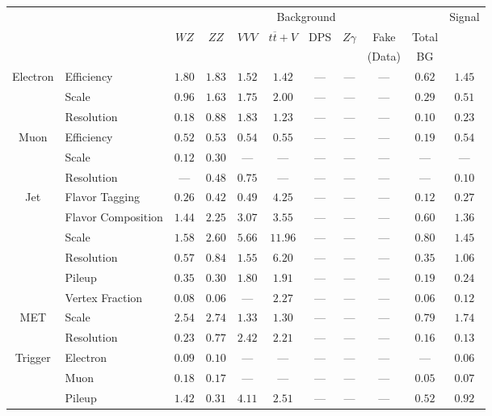 \small
\renewcommand{\tabcolsep}{4pt}
\begin{tabular}{|cl||ccccccc|c||c|}
\hline
 & & \multicolumn{8}{c||}{Background} & Signal\\ 
 & & $WZ$ & $ZZ$ & $VVV$ & $t\overline{t}+V$ & DPS & $Z\gamma$ & Fake & Total & \\ 
 & & &  &  &  &  &  & (Data) & BG & \\ 
\hline\hline
\multirow{3}{*}{Electron}
& Efficiency  & $ 1.80$  & $ 1.83$  & $ 1.52$  & $ 1.42$  & ---  & ---  & ---  & $ 0.62$  & $ 1.45$ \\ 
\cline{2-11}
& Scale  & $ 0.96$  & $ 1.63$  & $ 1.75$  & $ 2.00$  & ---  & ---  & ---  & $ 0.29$  & $ 0.51$ \\ 
\cline{2-11}
& Resolution & $0.18$& $0.88$& $1.83$& $1.23$&  --- &  --- &  --- & $0.10$& $0.23$\\ 
\hline
\multirow{3}{*}{Muon}
& Efficiency & $0.52$& $0.53$& $0.54$& $0.55$&  --- &  --- &  --- & $0.19$& $0.54$\\ 
\cline{2-11}
& Scale & $0.12$& $0.30$&  --- &  --- &  --- &  --- &  --- &  --- &  ---\\ 
\cline{2-11}
& Resolution  & ---  & $ 0.48$  & $ 0.75$  & ---  & ---  & ---  & ---  & ---  & $ 0.10$ \\ 
\hline
\multirow{6}{*}{Jet}
& Flavor Tagging  & $ 0.26$  & $ 0.42$  & $ 0.49$  & $ 4.25$  & ---  & ---  & ---  & $ 0.12$  & $ 0.27$ \\ 
\cline{2-11}
& Flavor Composition  & $ 1.44$  & $ 2.25$  & $ 3.07$  & $ 3.55$  & ---  & ---  & ---  & $ 0.60$  & $ 1.36$ \\ 
\cline{2-11}
& Scale  & $ 1.58$  & $ 2.60$  & $ 5.66$  & $ 11.96$  & ---  & ---  & ---  & $ 0.80$  & $ 1.45$ \\ 
\cline{2-11}
& Resolution & $0.57$& $0.84$& $1.55$& $6.20$&  --- &  --- &  --- & $0.35$& $1.06$\\ 
\cline{2-11}
& Pileup  & $ 0.35$  & $ 0.30$  & $ 1.80$  & $ 1.91$  & ---  & ---  & ---  & $ 0.19$  & $ 0.24$ \\ 
\cline{2-11}
& Vertex Fraction & $0.08$& $0.06$&  --- & $2.27$&  --- &  --- &  --- & $0.06$& $0.12$\\ 
\hline
\multirow{2}{*}{MET}
& Scale & $2.54$& $2.74$& $1.33$& $1.30$&  --- &  --- &  --- & $0.79$& $1.74$\\ 
\cline{2-11}
& Resolution & $0.23$& $0.77$& $2.42$& $2.21$&  --- &  --- &  --- & $0.16$& $0.13$\\ 
\hline
\multirow{2}{*}{Trigger}
& Electron & $0.09$& $0.10$&  --- &  --- &  --- &  --- &  --- &  --- & $0.06$\\ 
\cline{2-11}
& Muon & $0.18$& $0.17$&  --- &  --- &  --- &  --- &  --- & $0.05$& $0.07$\\ 
\hline
& Pileup & $1.42$& $0.31$& $4.11$& $2.51$&  --- &  --- &  --- & $0.52$& $0.92$\\ 
\hline
\end{tabular}
